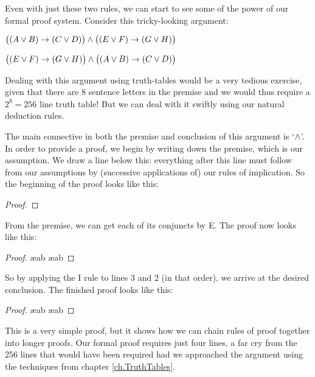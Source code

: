 Even with just these two rules, we can start to see some of the power of our formal proof system. Consider this tricky-looking argument:
\begin{earg}
\item[] $\bigl( (A\vee B)\rightarrow(C\vee D) \bigr) \wedge \bigl( (E \vee F) \rightarrow (G\vee H) \bigr)$
\item[\ttherefore] $\bigl( (E \vee F) \rightarrow (G\vee H) \bigr) \wedge \bigl( (A\vee B)\rightarrow(C\vee D) \bigr)$
\end{earg} Dealing with this argument using truth-tables would be a very tedious exercise, given that there are 8 sentence letters in the premise and we would thus require a $2^{8}=256$ line truth table! But we can deal with it swiftly using our natural deduction rules.

The main connective in both the premise and conclusion of this argument is `$\wedge$'. In order to provide a proof, we begin by writing down the premise, which is our assumption. We draw a line below this: everything after this line must follow from our assumptions by (successive applications of) our rules of implication. So the beginning of the proof looks like this:
\begin{proof}
\end{proof}
From the premise, we can get each of its conjuncts by {\eand}E. The proof now looks like this:
\begin{proof}
	 \ae{ab}
	 \ae{ab}
\end{proof}
So by applying the {\eand}I rule to lines 3 and 2 (in that order), we arrive at the desired conclusion. The finished proof looks like this:
\begin{proof}

	 \ae{ab}
	 \ae{ab}
	 
\end{proof}
This is a very simple proof, but it shows how we can chain rules of proof together into longer proofs. Our formal proof requires just four lines, a far cry from the 256 lines that would have been required had we approached the argument using the techniques from chapter \ref{ch.TruthTables}.

